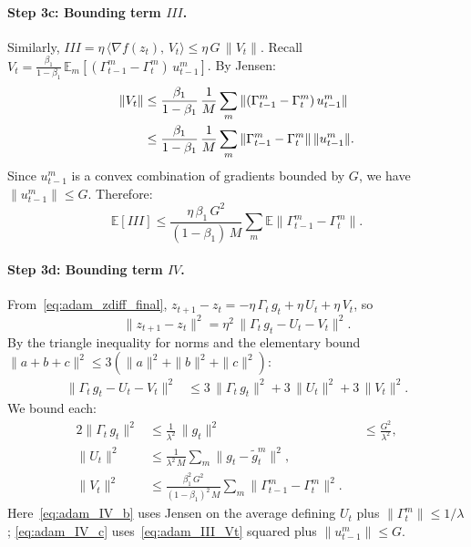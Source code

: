 \documentclass{article}
\begin{document}
\paragraph{Step 3c: Bounding term $III$.}

Similarly, $III = \eta\,\langle \nabla f(z_t),\, V_t \rangle \leq
\eta\,G\,\|V_t\|$. Recall
$V_t = \frac{\beta_1}{1-\beta_1}\,
\mathbb{E}_m[(\Gamma_{t-1}^m - \Gamma_t^m)\,u_{t-1}^m]$. By Jensen:
\begin{align}
\|V_t\| &\leq \frac{\beta_1}{1-\beta_1}\,
\frac{1}{M}\sum_m \|(\Gamma_{t-1}^m - \Gamma_t^m)\,u_{t-1}^m\| \notag \\
&\leq \frac{\beta_1}{1-\beta_1}\,
\frac{1}{M}\sum_m \|\Gamma_{t-1}^m - \Gamma_t^m\|\,\|u_{t-1}^m\|.
\label{eq:adam_III_Vt}
\end{align}
Since $u_{t-1}^m$ is a convex combination of gradients bounded by $G$, we have
$\|u_{t-1}^m\| \leq G$. Therefore:
\begin{equation}
\mathbb{E}[III]
\leq \frac{\eta\,\beta_1\,G^2}{(1-\beta_1)\,M}\sum_m
\mathbb{E}\|\Gamma_{t-1}^m - \Gamma_t^m\|.
\label{eq:adam_III_final}
\end{equation}

\paragraph{Step 3d: Bounding term $IV$.}

From~\eqref{eq:adam_zdiff_final},
$z_{t+1} - z_t = -\eta\,\Gamma_t\,g_t + \eta\,U_t + \eta\,V_t$, so
\begin{equation}
\|z_{t+1} - z_t\|^2
= \eta^2\,\|\Gamma_t\,g_t - U_t - V_t\|^2.
\label{eq:adam_IV_start}
\end{equation}
By the triangle inequality for norms and the elementary bound
$\|a + b + c\|^2 \leq 3(\|a\|^2 + \|b\|^2 + \|c\|^2)$:
\begin{align}
\|\Gamma_t\,g_t - U_t - V_t\|^2
&\leq 3\,\|\Gamma_t\,g_t\|^2
   + 3\,\|U_t\|^2
   + 3\,\|V_t\|^2.
\label{eq:adam_IV_triangle}
\end{align}
We bound each:
\begin{alignat}{2}
\|\Gamma_t\,g_t\|^2
&\leq \frac{1}{\lambda^2}\,\|g_t\|^2
&&\leq \frac{G^2}{\lambda^2},
\label{eq:adam_IV_a} \\[4pt]
\|U_t\|^2
&\leq \frac{1}{\lambda^2\,M}\sum_m\|g_t - \widetilde{g}_t^m\|^2,
\label{eq:adam_IV_b} \\[4pt]
\|V_t\|^2
&\leq \frac{\beta_1^2\,G^2}{(1-\beta_1)^2\,M}\sum_m
\|\Gamma_{t-1}^m - \Gamma_t^m\|^2.
\label{eq:adam_IV_c}
\end{alignat}
Here~\eqref{eq:adam_IV_b} uses Jensen on the average defining $U_t$ plus
$\|\Gamma_t^m\| \leq 1/\lambda$; \eqref{eq:adam_IV_c} uses~\eqref{eq:adam_III_Vt}
squared plus $\|u_{t-1}^m\| \leq G$.
\end{document}
